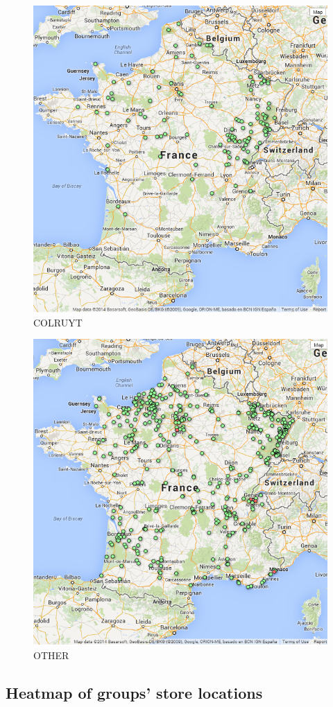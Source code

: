 \documentclass[11pt]{article}
\begin{document}
\begin{figure}[!h]
    \caption{COLRUYT}
	\centering
		\includegraphics[width=16cm]{images/COLRUYT.png}
\end{figure}

\begin{figure}[!h]
    \caption{OTHER}
	\centering
		\includegraphics[width=16cm]{images/AUTRE.png}
\end{figure}

\subsection{Heatmap of groups' store locations}
\end{document}
